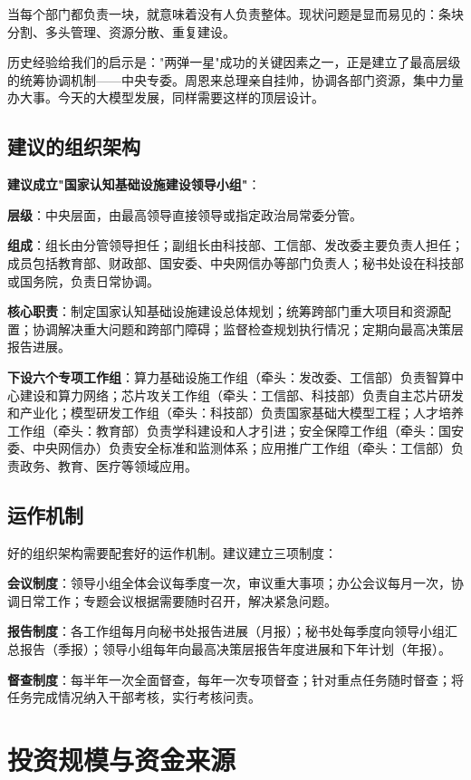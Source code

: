 当每个部门都负责一块，就意味着没有人负责整体。现状问题是显而易见的：条块分割、多头管理、资源分散、重复建设。

历史经验给我们的启示是："两弹一星"成功的关键因素之一，正是建立了最高层级的统筹协调机制——中央专委。周恩来总理亲自挂帅，协调各部门资源，集中力量办大事。今天的大模型发展，同样需要这样的顶层设计。

\subsection{建议的组织架构}

\textbf{建议成立"国家认知基础设施建设领导小组"}：

\textbf{层级}：中央层面，由最高领导直接领导或指定政治局常委分管。

\textbf{组成}：组长由分管领导担任；副组长由科技部、工信部、发改委主要负责人担任；成员包括教育部、财政部、国安委、中央网信办等部门负责人；秘书处设在科技部或国务院，负责日常协调。

\textbf{核心职责}：制定国家认知基础设施建设总体规划；统筹跨部门重大项目和资源配置；协调解决重大问题和跨部门障碍；监督检查规划执行情况；定期向最高决策层报告进展。

\textbf{下设六个专项工作组}：算力基础设施工作组（牵头：发改委、工信部）负责智算中心建设和算力网络；芯片攻关工作组（牵头：工信部、科技部）负责自主芯片研发和产业化；模型研发工作组（牵头：科技部）负责国家基础大模型工程；人才培养工作组（牵头：教育部）负责学科建设和人才引进；安全保障工作组（牵头：国安委、中央网信办）负责安全标准和监测体系；应用推广工作组（牵头：工信部）负责政务、教育、医疗等领域应用。

\subsection{运作机制}

好的组织架构需要配套好的运作机制。建议建立三项制度：

\textbf{会议制度}：领导小组全体会议每季度一次，审议重大事项；办公会议每月一次，协调日常工作；专题会议根据需要随时召开，解决紧急问题。

\textbf{报告制度}：各工作组每月向秘书处报告进展（月报）；秘书处每季度向领导小组汇总报告（季报）；领导小组每年向最高决策层报告年度进展和下年计划（年报）。

\textbf{督查制度}：每半年一次全面督查，每年一次专项督查；针对重点任务随时督查；将任务完成情况纳入干部考核，实行考核问责。

\section{投资规模与资金来源}

